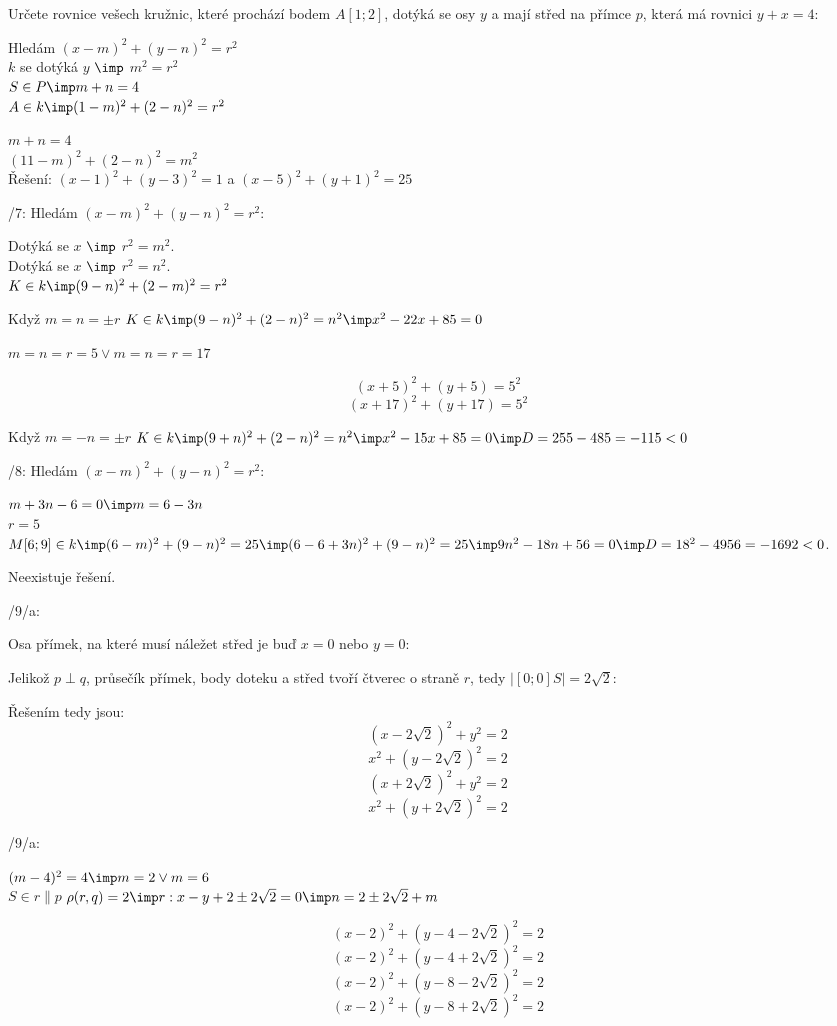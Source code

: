  \Pr Určete rovnice vešech kružnic, které prochází bodem $A[1;2]$, dotýká se osy $y$ a mají střed na přímce $p$, která má rovnici $y+x = 4$:

 Hledám $(x-m)^2 + (y-n)^2 = r^2$\\
$k$ se dotýká $y$ $\imp$ $m^2 = r^2$\\
$S \in P \imp m + n  = 4$\\
$A \in k \imp (1-m)^2 + (2-n)^2 = r^2$

$m+n = 4$\\
$(11-m)^2 + (2-n)^2 = m^2 $\\

Řešení:
$(x-1)^2 + (y-3)^2 = 1$
a
$(x-5)^2 + (y+1)^2 = 25$

/7:
Hledám $(x-m)^2 + (y-n)^2 = r^2$:

Dotýká se $x$ $\imp$ $r^2 = m^2$.\\
Dotýká se $x$ $\imp$ $r^2 = n^2$.\\
$K \in k \imp (9-n)^2 + (2-m)^2 = r^2 $ 

Když $m=n=\pm r$
$K \in k \imp (9-n)^2 + (2-n)^2 = n^2 \imp x^2-22x + 85 =0$ 

$m=n=r=5 \lor m=n=r = 17$

$$ (x+5)^2 + (y+5) = 5^2 $$
$$ (x+17)^2 + (y+17) = 5^2 $$

Když $m=-n=\pm r$
$K \in k \imp (9+n)^2 + (2-n)^2 = n^2 \imp x^2-15x + 85 =0 \imp D=255-4\*85 = -115 < 0$ 

/8:
Hledám $(x-m)^2 + (y-n)^2 = r^2$:

$m+3n-6 = 0 \imp m = 6-3n$\\
$r=5$\\
$M[6;9] \in k \imp (6-m)^2 + (9-n)^2 = 25 \imp (6-6+3n)^2 + (9-n)^2 = 25 \imp 9n^2 -18n+56 = 0 \imp D = 18^2 - 4 \* 9 \* 56 = -1692 < 0$.

Neexistuje řešení.

/9/a:

Osa přímek, na které musí náležet střed je buď $x=0$ nebo $y=0$:

Jelikož $p\perp q$, průsečík přímek, body doteku a střed tvoří čtverec o straně $r$, tedy $|[0;0]S| = 2\sqrt 2$:

Řešením tedy jsou:
$$ (x-2\sqrt 2)^2 + y^2 = 2 $$
$$ x^2 + (y-2\sqrt 2)^2 = 2 $$
$$ (x+2\sqrt 2)^2 + y^2 = 2 $$
$$ x^2 + (y+2\sqrt 2)^2 = 2 $$

/9/a:

$(m-4)^2 = 4  \imp m = 2 \lor m = 6$\\
$S \in r \parallel p$
$\rho(r,q) = 2 \imp r:x-y+2\pm 2\sqrt 2=0  \imp n = 2\pm 2\sqrt 2  +m $

$$ (x-2)^2 + (y-4-2 \sqrt 2)^2 = 2 $$
$$ (x-2)^2 + (y-4+2 \sqrt 2)^2 = 2 $$
$$ (x-2)^2 + (y-8-2 \sqrt 2)^2 = 2 $$
$$ (x-2)^2 + (y-8+2 \sqrt 2)^2 = 2 $$

\EndDoc
